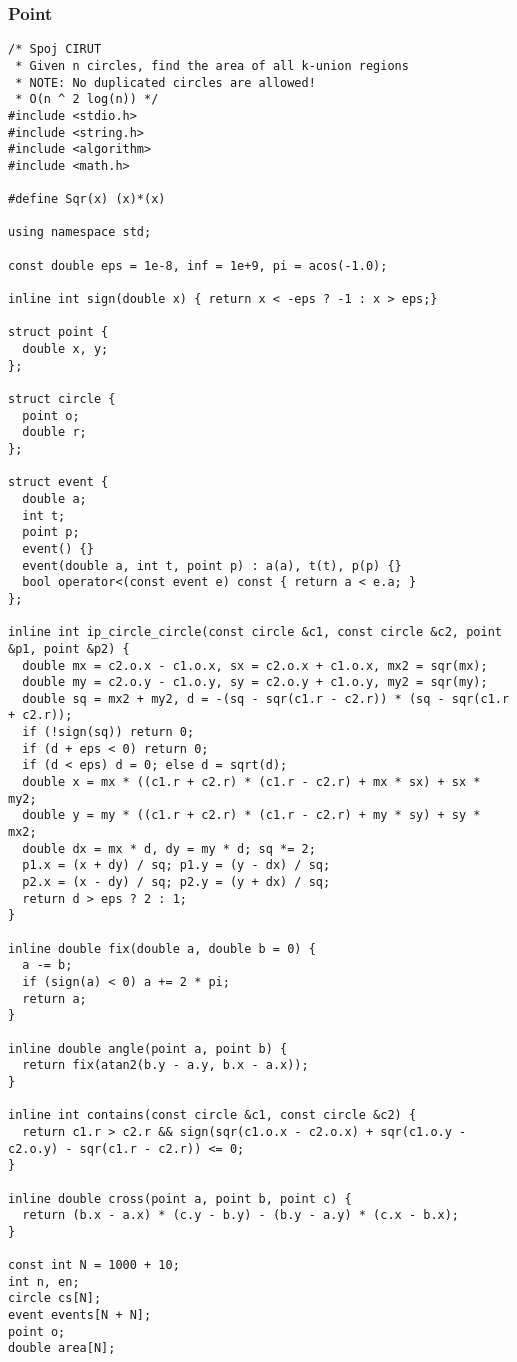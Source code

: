 \subsubsection{Point}
\begin{verbatim}
/* Spoj CIRUT
 * Given n circles, find the area of all k-union regions
 * NOTE: No duplicated circles are allowed!
 * O(n ^ 2 log(n)) */
#include <stdio.h>
#include <string.h>
#include <algorithm>
#include <math.h>

#define Sqr(x) (x)*(x)

using namespace std;

const double eps = 1e-8, inf = 1e+9, pi = acos(-1.0);

inline int sign(double x) { return x < -eps ? -1 : x > eps;}

struct point {
  double x, y;
};

struct circle {
  point o;
  double r;
};

struct event {
  double a;
  int t;
  point p;
  event() {}
  event(double a, int t, point p) : a(a), t(t), p(p) {}
  bool operator<(const event e) const { return a < e.a; }
};

inline int ip_circle_circle(const circle &c1, const circle &c2, point &p1, point &p2) {
  double mx = c2.o.x - c1.o.x, sx = c2.o.x + c1.o.x, mx2 = sqr(mx);
  double my = c2.o.y - c1.o.y, sy = c2.o.y + c1.o.y, my2 = sqr(my);
  double sq = mx2 + my2, d = -(sq - sqr(c1.r - c2.r)) * (sq - sqr(c1.r + c2.r));
  if (!sign(sq)) return 0;
  if (d + eps < 0) return 0;
  if (d < eps) d = 0; else d = sqrt(d);
  double x = mx * ((c1.r + c2.r) * (c1.r - c2.r) + mx * sx) + sx * my2;
  double y = my * ((c1.r + c2.r) * (c1.r - c2.r) + my * sy) + sy * mx2;
  double dx = mx * d, dy = my * d; sq *= 2;
  p1.x = (x + dy) / sq; p1.y = (y - dx) / sq;
  p2.x = (x - dy) / sq; p2.y = (y + dx) / sq;
  return d > eps ? 2 : 1;
}

inline double fix(double a, double b = 0) {
  a -= b;
  if (sign(a) < 0) a += 2 * pi;
  return a;
}

inline double angle(point a, point b) {
  return fix(atan2(b.y - a.y, b.x - a.x));
}

inline int contains(const circle &c1, const circle &c2) {
  return c1.r > c2.r && sign(sqr(c1.o.x - c2.o.x) + sqr(c1.o.y - c2.o.y) - sqr(c1.r - c2.r)) <= 0;
}

inline double cross(point a, point b, point c) {
  return (b.x - a.x) * (c.y - b.y) - (b.y - a.y) * (c.x - b.x);
}

const int N = 1000 + 10;
int n, en;
circle cs[N];
event events[N + N];
point o;
double area[N];


\end{verbatim}
